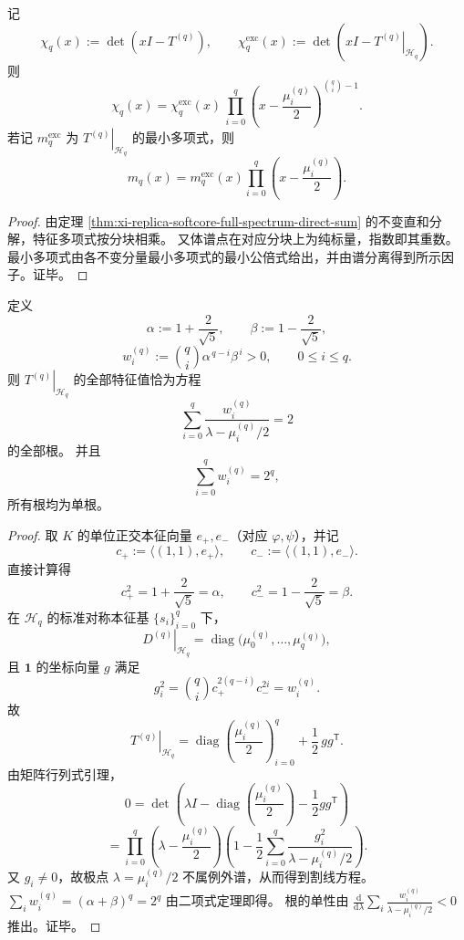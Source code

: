 \begin{corollary}[特征多项式分解与体谱因子闭式]\label{cor:xi-replica-softcore-charpoly-bulk-factorization}
记
\[
\chi_q(x):=\det(xI-T^{(q)}),
\qquad
\chi_q^{\mathrm{exc}}(x):=\det\!\left(xI-\left.T^{(q)}\right|_{\mathcal H_q}\right).
\]
则
\[
\chi_q(x)
=
\chi_q^{\mathrm{exc}}(x)\,
\prod_{i=0}^{q}\left(x-\frac{\mu_i^{(q)}}2\right)^{\binom{q}{i}-1}.
\]
若记 \(m_q^{\mathrm{exc}}\) 为 \(\left.T^{(q)}\right|_{\mathcal H_q}\) 的最小多项式，则
\[
m_q(x)=m_q^{\mathrm{exc}}(x)\prod_{i=0}^{q}\left(x-\frac{\mu_i^{(q)}}2\right).
\]
\end{corollary}
\begin{proof}
由定理 \ref{thm:xi-replica-softcore-full-spectrum-direct-sum} 的不变直和分解，特征多项式按分块相乘。
又体谱点在对应分块上为纯标量，指数即其重数。
最小多项式由各不变分量最小多项式的最小公倍式给出，并由谱分离得到所示因子。证毕。
\end{proof}

\begin{theorem}[例外谱的加权割线方程]\label{thm:xi-replica-softcore-exceptional-weighted-secular}
定义
\[
\alpha:=1+\frac{2}{\sqrt5},
\qquad
\beta:=1-\frac{2}{\sqrt5},
\]
\[
w_i^{(q)}:=\binom{q}{i}\alpha^{\,q-i}\beta^{\,i}>0,
\qquad 0\le i\le q.
\]
则 \(\left.T^{(q)}\right|_{\mathcal H_q}\) 的全部特征值恰为方程
\[
\sum_{i=0}^{q}\frac{w_i^{(q)}}{\lambda-\mu_i^{(q)}/2}=2
\]
的全部根。
并且
\[
\sum_{i=0}^{q}w_i^{(q)}=2^q,
\]
所有根均为单根。
\end{theorem}
\begin{proof}
取 \(K\) 的单位正交本征向量 \(e_+,e_-\)（对应 \(\varphi,\psi\)），并记
\[
c_+:=\langle(1,1),e_+\rangle,\qquad c_-:=\langle(1,1),e_-\rangle.
\]
直接计算得
\[
c_+^2=1+\frac{2}{\sqrt5}=\alpha,\qquad
c_-^2=1-\frac{2}{\sqrt5}=\beta.
\]
在 \(\mathcal H_q\) 的标准对称本征基 \(\{s_i\}_{i=0}^{q}\) 下，
\[
\left.D^{(q)}\right|_{\mathcal H_q}=\operatorname{diag}\bigl(\mu_0^{(q)},\dots,\mu_q^{(q)}\bigr),
\]
且 \(\mathbf1\) 的坐标向量 \(g\) 满足
\[
g_i^2=\binom{q}{i}c_+^{2(q-i)}c_-^{2i}=w_i^{(q)}.
\]
故
\[
\left.T^{(q)}\right|_{\mathcal H_q}
=
\operatorname{diag}\!\left(\frac{\mu_i^{(q)}}2\right)_{i=0}^{q}
+\frac12\,gg^{\mathsf T}.
\]
由矩阵行列式引理，
\[
0=
\det\!\left(
\lambda I-\operatorname{diag}\!\left(\frac{\mu_i^{(q)}}2\right)-\frac12gg^{\mathsf T}
\right)
\]
\[
=
\prod_{i=0}^{q}\left(\lambda-\frac{\mu_i^{(q)}}2\right)
\left(
1-\frac12\sum_{i=0}^{q}\frac{g_i^2}{\lambda-\mu_i^{(q)}/2}
\right).
\]
又 \(g_i\neq0\)，故极点 \(\lambda=\mu_i^{(q)}/2\) 不属例外谱，从而得到割线方程。
\(\sum_i w_i^{(q)}=(\alpha+\beta)^q=2^q\) 由二项式定理即得。
根的单性由
\(
\frac{\mathrm d}{\mathrm d\lambda}\sum_i\frac{w_i^{(q)}}{\lambda-\mu_i^{(q)}/2}<0
\)
推出。证毕。
\end{proof}


